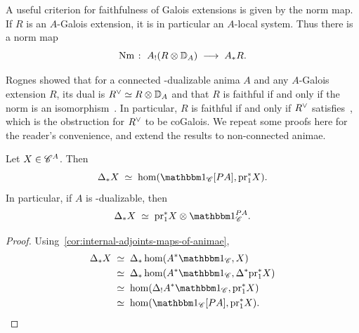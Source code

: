 \documentclass[english,svgnames,table]{article}
\begin{document}
    A useful criterion for faithfulness of Galois extensions is given by the norm map. If $R$ is an $A$-Galois extension, it is in particular an $A$-local system. Thus there is a norm map
    \begin{equation*}
        \operatorname{Nm} \;\colon\; A_!(R \otimes \mathbb{D}_A) \;\longrightarrow\; A_* R.
    \end{equation*}
    
    Rognes showed that for a connected \COB-dualizable anima $A$ and any $A$-Galois extension $R$, its dual is $R^{\vee} \simeq R \otimes \mathbb{D}_A$ and that $R$ is faithful if and only if the norm is an isomorphism~\cite[Propositions~6.3.3 and~6.4.7]{Rognes-2008-Galois}. In particular, $R$ is faithful if and only if $R^{\vee}$ satisfies~, which is the obstruction for $R^{\vee}$ to be coGalois.
    We repeat some proofs here for the reader's convenience, and extend the results to non-connected animae.

    \begin{lemma}
    \label{lem:X^G=X@1^G}
        Let $X \in \mathscr{C}^A$. Then
        \begin{equation*}
            \Delta_* X \;\simeq\; \hom(\ounit_{\cC}[\Path A], \pr_1^* X).
        \end{equation*}
        In particular, if $A$ is \COB-dualizable, then
        \begin{equation*}
            \Delta_* X \;\simeq\; \pr_1^* X \otimes \ounit_{\cC}^{\Path A}.
        \end{equation*}
    \end{lemma}
    \begin{proof}
        Using~\cref{cor:internal-adjoints-maps-of-animae},
        \begin{equation*}
            \begin{split}
                \Delta_* X 
                & \;\simeq\; \Delta_* \hom(A^* \ounit_{\cC}, X) \\
                & \;\simeq\; \Delta_*\hom(A^* \ounit_{\cC}, \Delta^* \pr_1^* X) \\
                & \;\simeq\; \hom(\Delta_! A^* \ounit_{\cC}, \pr_1^* X) \\
                & \;\simeq\; \hom(\ounit_{\cC}[\Path A], \pr_1^* X).
            \end{split}
        \end{equation*}
    \end{proof}

\end{document}
